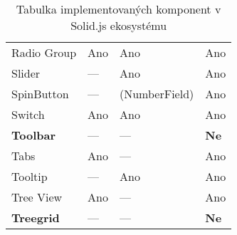 \begin{table}[ht]
\begin{tabularx}{\textwidth}{Y Y Y Y}
        Radio Group           & Ano                   & Ano                & Ano                               \\
        Slider                & ---                   & Ano                & Ano                               \\
        SpinButton            & ---                   & (NumberField)      & Ano                               \\
        Switch                & Ano                   & Ano                & Ano                               \\
        \textbf{Toolbar}      & ---                   & ---                & \textbf{Ne}                       \\
        Tabs                  & Ano                   & ---                & Ano                               \\
        Tooltip               & ---                   & Ano                & Ano                               \\
        Tree View             & Ano                   & ---                & Ano                               \\
        \textbf{Treegrid}     & ---                   & ---                & \textbf{Ne}
    \end{tabularx}
    \caption{Tabulka implementovaných komponent v Solid.js ekosystému}
    \label{tab:implemented-components}
\end{table}
